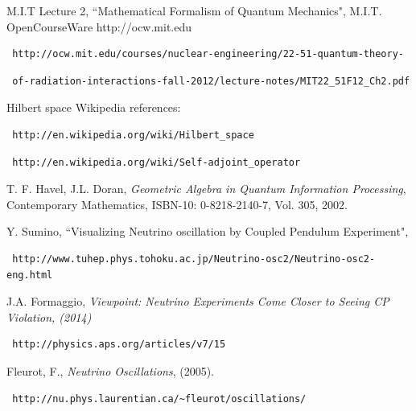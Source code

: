 \documentclass[]{article}
\begin{document}
\begin{thebibliography}{}
 M.I.T Lecture 2, ``Mathematical Formalism of Quantum Mechanics", M.I.T. OpenCourseWare http://ocw.mit.edu 
\begin{verbatim} http://ocw.mit.edu/courses/nuclear-engineering/22-51-quantum-theory-\end{verbatim}
\begin{verbatim} of-radiation-interactions-fall-2012/lecture-notes/MIT22_51F12_Ch2.pdf \end{verbatim}
 Hilbert space Wikipedia references:
\begin{verbatim} http://en.wikipedia.org/wiki/Hilbert_space \end{verbatim}
\begin{verbatim} http://en.wikipedia.org/wiki/Self-adjoint_operator \end{verbatim}
  
 T. F. Havel, J.L. Doran, {\em Geometric Algebra in Quantum Information Processing},
Contemporary Mathematics, ISBN-10: 0-8218-2140-7, Vol. 305, 2002.

    







 Y. Sumino, ``Visualizing Neutrino oscillation by Coupled Pendulum Experiment",
 \begin{verbatim} http://www.tuhep.phys.tohoku.ac.jp/Neutrino-osc2/Neutrino-osc2-eng.html \end{verbatim}
 J.A. Formaggio, {\em Viewpoint: Neutrino Experiments Come Closer to Seeing CP  Violation, (2014)} 
 \begin{verbatim} http://physics.aps.org/articles/v7/15 \end{verbatim}
 Fleurot, F., {\em Neutrino Oscillations}, (2005).
 \begin{verbatim} http://nu.phys.laurentian.ca/~fleurot/oscillations/ \end{verbatim}
 
\end{thebibliography}    
\end{document}
